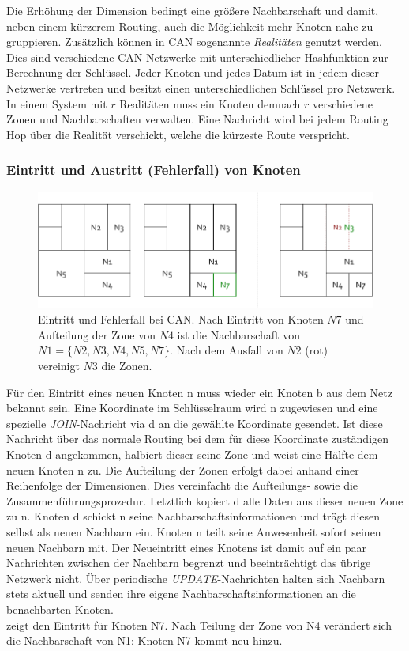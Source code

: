 Die Erhöhung der Dimension bedingt eine größere Nachbarschaft und damit, neben einem kürzerem Routing, auch die Möglichkeit mehr Knoten nahe zu gruppieren. Zusätzlich können in CAN sogenannte \emph{Realitäten} genutzt werden. Dies sind verschiedene CAN-Netzwerke mit unterschiedlicher Hashfunktion zur Berechnung der Schlüssel. Jeder Knoten und jedes Datum ist in jedem dieser Netzwerke vertreten und besitzt einen unterschiedlichen Schlüssel pro Netzwerk. In einem System mit $r$ Realitäten muss ein Knoten demnach $r$ verschiedene Zonen und Nachbarschaften verwalten. Eine Nachricht wird bei jedem Routing Hop über die Realität verschickt, welche die kürzeste Route verspricht.

\subsubsection*{Eintritt und Austritt (Fehlerfall) von Knoten}
\begin{figure}[htbp]
\centering
\includegraphics{grafics/can_new_node.pdf}
\caption{Eintritt und Fehlerfall bei CAN. Nach Eintritt von Knoten $N7$ und Aufteilung der Zone von $N4$ ist die Nachbarschaft von $N1 = \{N2, N3, N4, N5, N7\}$. Nach dem Ausfall von $N2$ (rot) vereinigt $N3$ die Zonen.}
\label{fig:can_new_node}
\end{figure}

Für den Eintritt eines neuen Knoten n muss wieder ein Knoten b aus dem Netz bekannt sein. Eine Koordinate im Schlüsselraum wird n zugewiesen und eine spezielle \emph{JOIN}-Nachricht via d an die gewählte Koordinate gesendet. Ist diese Nachricht über das normale Routing bei dem für diese Koordinate zuständigen Knoten d angekommen, halbiert dieser seine Zone und weist eine Hälfte dem neuen Knoten n zu. Die Aufteilung der Zonen erfolgt dabei anhand einer Reihenfolge der Dimensionen. Dies vereinfacht die Aufteilungs- sowie die Zusammenführungsprozedur. Letztlich kopiert d alle Daten aus dieser neuen Zone zu n. Knoten d schickt n seine Nachbarschaftsinformationen und trägt diesen selbst als neuen Nachbarn ein. Knoten n teilt seine Anwesenheit sofort seinen neuen Nachbarn mit. Der Neueintritt eines Knotens ist damit auf ein paar Nachrichten zwischen der Nachbarn begrenzt und beeinträchtigt das übrige Netzwerk nicht. Über periodische \emph{UPDATE}-Nachrichten halten sich Nachbarn stets aktuell und senden ihre eigene Nachbarschaftsinformationen an die benachbarten Knoten.\\
 zeigt den Eintritt für Knoten N7. Nach Teilung der Zone von N4 verändert sich die Nachbarschaft von N1: Knoten N7 kommt neu hinzu.

